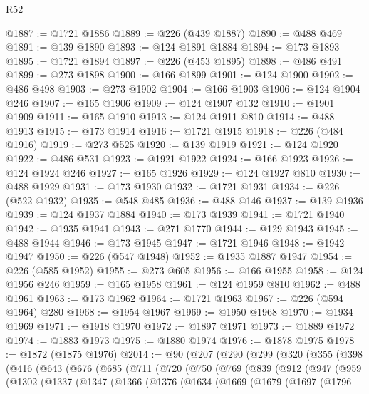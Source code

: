 \begin{lexlean}{R52}
\begin{coremodule}
@1887 := @1721 @1886
@1889 := @226 (@439 @1887)
@1890 := @488 @469
@1891 := @139 @1890
@1893 := @124 @1891 @1884
@1894 := @173 @1893
@1895 := @1721 @1894
@1897 := @226 (@453 @1895)
@1898 := @486 @491
@1899 := @273 @1898
@1900 := @166 @1899
@1901 := @124 @1900
@1902 := @486 @498
@1903 := @273 @1902
@1904 := @166 @1903
@1906 := @124 @1904 @246
@1907 := @165 @1906
@1909 := @124 @1907 @132
@1910 := @1901 @1909
@1911 := @165 @1910
@1913 := @124 @1911 @810
@1914 := @488 @1913
@1915 := @173 @1914
@1916 := @1721 @1915
@1918 := @226 (@484 @1916)
@1919 := @273 @525
@1920 := @139 @1919
@1921 := @124 @1920
@1922 := @486 @531
@1923 := @1921 @1922
@1924 := @166 @1923
@1926 := @124 @1924 @246
@1927 := @165 @1926
@1929 := @124 @1927 @810
@1930 := @488 @1929
@1931 := @173 @1930
@1932 := @1721 @1931
@1934 := @226 (@522 @1932)
@1935 := @548 @485
@1936 := @488 @146
@1937 := @139 @1936
@1939 := @124 @1937 @1884
@1940 := @173 @1939
@1941 := @1721 @1940
@1942 := @1935 @1941
@1943 := @271 @1770
@1944 := @129 @1943
@1945 := @488 @1944
@1946 := @173 @1945
@1947 := @1721 @1946
@1948 := @1942 @1947
@1950 := @226 (@547 @1948)
@1952 := @1935 @1887 @1947
@1954 := @226 (@585 @1952)
@1955 := @273 @605
@1956 := @166 @1955
@1958 := @124 @1956 @246
@1959 := @165 @1958
@1961 := @124 @1959 @810
@1962 := @488 @1961
@1963 := @173 @1962
@1964 := @1721 @1963
@1967 := @226 (@594 @1964) @280
@1968 := @1954 @1967
@1969 := @1950 @1968
@1970 := @1934 @1969
@1971 := @1918 @1970
@1972 := @1897 @1971
@1973 := @1889 @1972
@1974 := @1883 @1973
@1975 := @1880 @1974
@1976 := @1878 @1975
@1978 := @1872 (@1875 @1976)
@2014 := @90
    (@207
      (@290
        (@299
          (@320
            (@355
              (@398
                (@416
                  (@643
                    (@676
                      (@685
                        (@711
                          (@720
                            (@750
                              (@769
                                (@839
                                  (@912
                                    (@947
                                      (@959
                                        (@1302
                                          (@1337
                                            (@1347
                                              (@1366
                                                (@1376
                                                  (@1634
                                                    (@1669
                                                      (@1679
                                                        (@1697
                                                          (@1796

\end{coremodule}
\end{lexlean}
